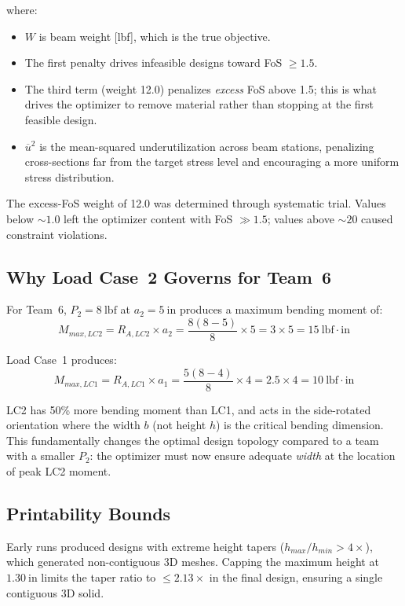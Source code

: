 \documentclass[11pt,letterpaper]{article}
\begin{document}
where:
\begin{itemize}[noitemsep]
  \item $W$ is beam weight [lbf], which is the true objective.
  \item The first penalty drives infeasible designs toward FoS $\ge 1.5$.
  \item The third term (weight 12.0) penalizes \emph{excess} FoS above 1.5;
    this is what drives the optimizer to remove material rather than
    stopping at the first feasible design.
  \item $\overline{u}^2$ is the mean-squared underutilization across beam
    stations, penalizing cross-sections far from the target stress level and
    encouraging a more uniform stress distribution.
\end{itemize}

The excess-FoS weight of 12.0 was determined through systematic trial.
Values below $\sim 1.0$ left the optimizer content with FoS $\gg 1.5$;
values above $\sim 20$ caused constraint violations.

\subsection{Why Load Case~2 Governs for Team~6}

For Team~6, $P_2 = 8\ \mathrm{lbf}$ at $a_2 = 5\ \mathrm{in}$
produces a maximum bending moment of:
\[
  M_{max,LC2} = R_{A,LC2} \times a_2
  = \frac{8(8-5)}{8} \times 5 = 3 \times 5 = 15\ \mathrm{lbf \cdot in}
\]

Load Case~1 produces:
\[
  M_{max,LC1} = R_{A,LC1} \times a_1
  = \frac{5(8-4)}{8} \times 4 = 2.5 \times 4 = 10\ \mathrm{lbf \cdot in}
\]

LC2 has 50\% more bending moment than LC1, and acts in the side-rotated
orientation where the width $b$ (not height $h$) is the critical bending
dimension.  This fundamentally changes the optimal design topology compared
to a team with a smaller $P_2$: the optimizer must now ensure adequate
\emph{width} at the location of peak LC2 moment.

\subsection{Printability Bounds}

Early runs produced designs with extreme height tapers
($h_{max}/h_{min} > 4\times$), which generated non-contiguous 3D meshes.
Capping the maximum height at $1.30\ \mathrm{in}$ limits the taper ratio
to $\le 2.13\times$ in the final design, ensuring a single contiguous
3D solid.
\end{document}
